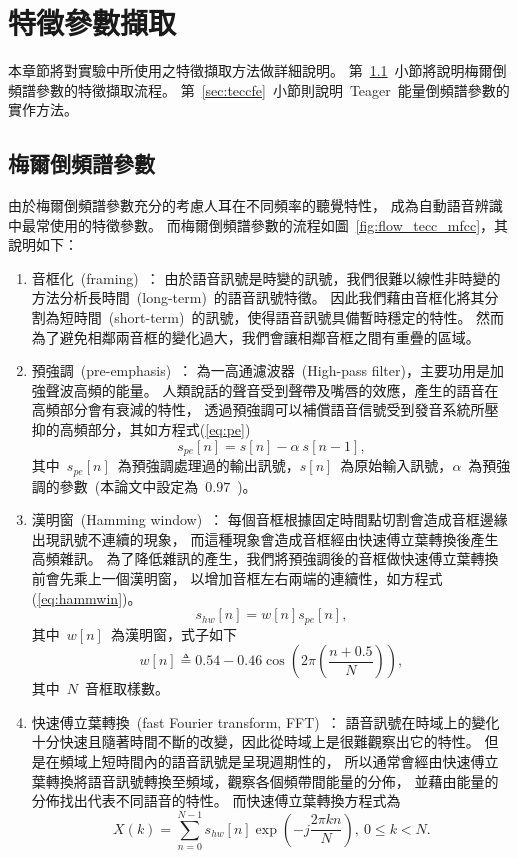 \chapter{特徵參數擷取}
\label{ch:feature-extraction}
本章節將對實驗中所使用之特徵擷取方法做詳細說明。
第~\ref{sec:mfccfe}~小節將說明梅爾倒頻譜參數的特徵擷取流程。
第~\ref{sec:teccfe}~小節則說明~Teager~能量倒頻譜參數的實作方法。 

\section {梅爾倒頻譜參數}
\label{sec:mfccfe}
由於梅爾倒頻譜參數充分的考慮人耳在不同頻率的聽覺特性，
成為自動語音辨識中最常使用的特徵參數。
而梅爾倒頻譜參數的流程如圖~\ref{fig:flow_tecc_mfcc}，其說明如下：    
\begin{enumerate}
\item 音框化~(framing)~：
由於語音訊號是時變的訊號，我們很難以線性非時變的方法分析長時間~(long-term)~的語音訊號特徵。
因此我們藉由音框化將其分割為短時間~(short-term)~的訊號，使得語音訊號具備暫時穩定的特性。
然而為了避免相鄰兩音框的變化過大，我們會讓相鄰音框之間有重疊的區域。
\item 預強調~(pre-emphasis)~：
為一高通濾波器~(High-pass filter)，主要功用是加強聲波高頻的能量。
人類說話的聲音受到聲帶及嘴唇的效應，產生的語音在高頻部分會有衰減的特性，
透過預強調可以補償語音信號受到發音系統所壓抑的高頻部分，其如方程式(\ref{eq:pe})
\begin{equation}
\label{eq:pe}
    s_{pe}[n] = s[n] - \alpha ~ s[n-1],
\end{equation}
其中~$s_{pe}[n]$~為預強調處理過的輸出訊號，$s[n]$~為原始輸入訊號，$\alpha$~為預強調的參數~(本論文中設定為~$0.97$~)。

\item 漢明窗~(Hamming window)~：	
每個音框根據固定時間點切割會造成音框邊緣出現訊號不連續的現象，
而這種現象會造成音框經由快速傅立葉轉換後產生高頻雜訊。
為了降低雜訊的產生，我們將預強調後的音框做快速傅立葉轉換前會先乘上一個漢明窗，
以增加音框左右兩端的連續性，如方程式(\ref{eq:hammwin})。
\begin{equation}
\label{eq:hammwin}
    s_{hw}[n] = w[n] s_{pe}[n],
\end{equation}
  其中~$w[n]$~為漢明窗，式子如下
  \[
	w[n] \triangleq 0.54-0.46 \cos \left( 2\pi \left(\frac{n+0.5}{N} \right) \right),
  \]  
  其中~$N$~音框取樣數。
\item 快速傅立葉轉換~(fast Fourier transform, FFT)~：
語音訊號在時域上的變化十分快速且隨著時間不斷的改變，因此從時域上是很難觀察出它的特性。
但是在頻域上短時間內的語音訊號是呈現週期性的，
所以通常會經由快速傅立葉轉換將語音訊號轉換至頻域，觀察各個頻帶間能量的分佈，
並藉由能量的分佈找出代表不同語音的特性。
而快速傅立葉轉換方程式為
\begin{equation}
\label{eq:fft}
   X(k) = \sum_{n = 0}^{N-1}  s_{hw}[n] \exp \left( -j \frac{2 \pi kn}{N} \right) ,~0 \leq k < N. 
\end{equation}


\end{enumerate}
